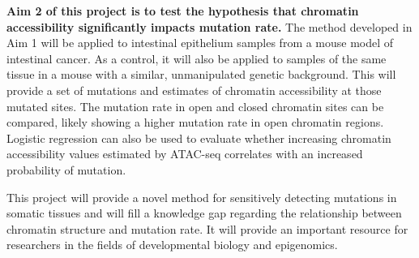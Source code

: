 \textbf{Aim 2 of this project is to test the hypothesis that chromatin accessibility significantly impacts mutation rate.}
The method developed in Aim 1 will be applied to intestinal epithelium samples from a mouse model of intestinal cancer.
As a control, it will also be applied to samples of the same tissue in a mouse with a similar, unmanipulated genetic background.
This will provide a set of mutations and estimates of chromatin accessibility at those mutated sites. The mutation rate in open and closed chromatin sites can be compared, likely showing a higher mutation rate in open chromatin regions.
Logistic regression can also be used to evaluate whether increasing chromatin accessibility values estimated by ATAC-seq correlates with an increased probability of mutation.

This project will provide a novel method for sensitively detecting  mutations in somatic tissues and will fill a knowledge gap regarding the relationship between chromatin structure and mutation rate. It will provide an important resource for researchers in the fields of developmental biology and epigenomics.
